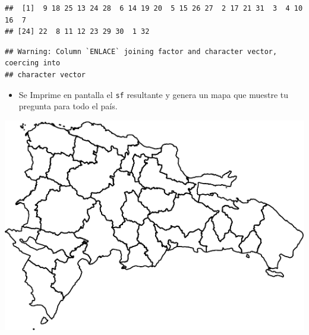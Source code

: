 \documentclass[11pt,]{article}
\newenvironment{Shaded}{\begin{snugshade}}{\end{snugshade}}
\newcommand{\KeywordTok}[1]{\textcolor[rgb]{0.13,0.29,0.53}{\textbf{#1}}}
\newcommand{\DataTypeTok}[1]{\textcolor[rgb]{0.13,0.29,0.53}{#1}}
\newcommand{\StringTok}[1]{\textcolor[rgb]{0.31,0.60,0.02}{#1}}
\newcommand{\OperatorTok}[1]{\textcolor[rgb]{0.81,0.36,0.00}{\textbf{#1}}}
\newcommand{\NormalTok}[1]{#1}
\providecommand{\tightlist}{%
\setlength{\itemsep}{0pt}\setlength{\parskip}{0pt}}
\begin{document}
\begin{verbatim}
##  [1]  9 18 25 13 24 28  6 14 19 20  5 15 26 27  2 17 21 31  3  4 10 16  7
## [24] 22  8 11 12 23 29 30  1 32
\end{verbatim}

\begin{Shaded}
\end{Shaded}

\begin{verbatim}
## Warning: Column `ENLACE` joining factor and character vector, coercing into
## character vector
\end{verbatim}

\begin{itemize}
\tightlist
\item
  Se Imprime en pantalla el \texttt{sf} resultante y genera un mapa que
  muestre tu pregunta para todo el país.
\end{itemize}

\begin{Shaded}
\end{Shaded}

\includegraphics{proyecto_files/figure-latex/unnamed-chunk-3-1.pdf}
\end{document}
